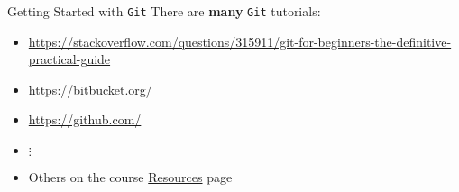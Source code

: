 \documentclass[onlymath, nologo]{beamer}
\begin{document}
  \begin{frame}{Getting Started with \texttt{Git}}
    There are \textbf{many} \texttt{Git} tutorials:
    \begin{itemize}
      \item \url{https://stackoverflow.com/questions/315911/git-for-beginners-the-definitive-practical-guide}%
      \item \url{https://bitbucket.org/} 
      \item \url{https://github.com/}
      \item \hspace{2.0em} $\vdots$
      \item Others on the course \href{https://iacs-cs-207.github.io/cs207-F17/resources.html}{Resources} page
    \end{itemize}
  \end{frame}
\end{document}
